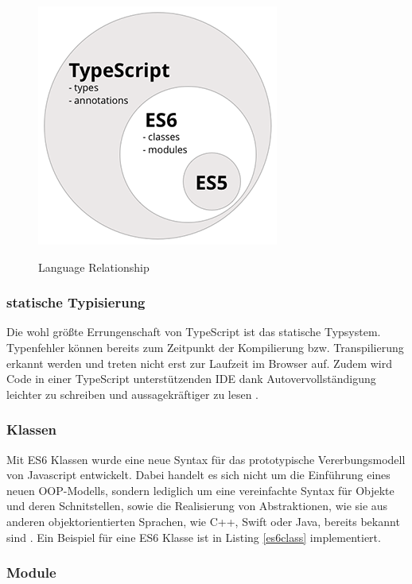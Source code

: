\begin{figure}[ht]
 \centering
 \includegraphics[width=0.4\linewidth]{kapitel2/typescript----es5-es6-typescript-circle-diagram.png}
 \caption{Language Relationship}\cite[152]{ng-Book-2}
\end{figure}


\subsubsection{statische Typisierung}

Die wohl größte Errungenschaft von TypeScript ist das statische Typsystem.
Typenfehler können bereits zum Zeitpunkt
der Kompilierung bzw. Transpilierung erkannt werden und treten nicht erst zur Laufzeit im Browser auf.
Zudem wird Code in einer TypeScript unterstützenden IDE dank Autovervollständigung
leichter zu schreiben und aussagekräftiger zu lesen \cite[156]{ng-Book-2}.

\subsubsection{Klassen}

Mit ES6 Klassen wurde eine neue Syntax für das prototypische Vererbungsmodell von Javascript entwickelt.
Dabei handelt es sich nicht um die Einführung eines neuen OOP-Modells, sondern lediglich um eine vereinfachte Syntax für Objekte und deren Schnitstellen,
sowie die Realisierung von Abstraktionen, wie sie aus anderen objektorientierten Sprachen, wie C++, Swift oder Java, bereits bekannt sind \cite{js-Klassen}.
Ein Beispiel für eine ES6 Klasse ist in Listing \ref{es6class} implementiert.

\vspace{0.3cm}


\subsubsection{Module}

